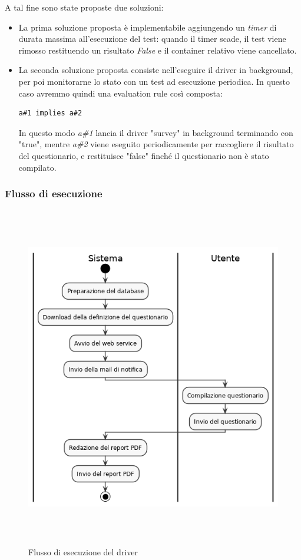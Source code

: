 \documentclass[../main.tex]{subfiles}
\begin{document}
A tal fine sono state proposte due soluzioni:
\begin{itemize}
    \item La prima soluzione proposta è implementabile aggiungendo un \textit{timer} di durata massima all'esecuzione del test: quando il timer scade, il test viene rimosso restituendo un risultato \textit{False} e il container relativo viene cancellato.
\item La seconda soluzione proposta consiste nell'eseguire il driver in background, per poi monitorarne lo stato con un test ad esecuzione periodica. 
In questo caso avremmo quindi una evaluation rule così composta:
\begin{Verbatim}[frame=single]
a#1 implies a#2
\end{Verbatim}
In questo modo \textit{a\#1} lancia il driver "survey" in background terminando con "true", mentre \textit{a\#2} viene eseguito periodicamente per raccogliere il risultato del questionario, e restituisce "false" finché il questionario non è stato compilato.
\end{itemize}
\subsubsection{Flusso di esecuzione}
\begin{figure}[H]
\centering
\includegraphics[height=15cm]{immagini/DRIVER_SURVEY.png}
\caption{Flusso di esecuzione del driver}\label{fig:flussodriver2}

\end{figure}
\end{document}
